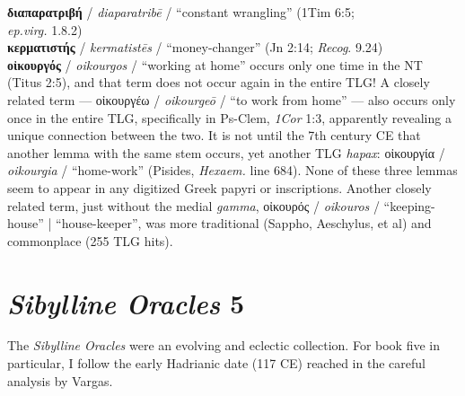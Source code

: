 \noindent{}\textbf{διαπαρατριβή} / \textit{diaparatribē} / “constant wrangling” %
(1Tim 6:5; \\\makebox[3em][l]{}\textit{ep.virg.} 1.8.2) \\[0.4mm] %
\noindent{}\textbf{κερματιστής} / \textit{kermatistēs} / “money-changer” %
(Jn 2:14; \textit{Recog}. 9.24) \\[1mm] %
\noindent{}\textbf{οἰκουργός} / \textit{oikourgos} / “working at home” occurs only one time in the NT (Titus 2:5), %
and that term does not occur again in the entire TLG! %
A closely related term --- οἰκουργέω / \textit{oikourgeō} / “to work from home” --- also occurs only once in the entire TLG, %
specifically in Ps-Clem, \textit{1Cor} 1:3, %
apparently revealing a unique connection between the two. %
It is not until the 7th century CE that another lemma with the same stem occurs, %
yet another TLG \textit{hapax}: οἰκουργία / \textit{oikourgia} / “home-work” (Pisides, \textit{Hexaem.} line 684). %
None of these three lemmas seem to appear in any digitized Greek papyri or inscriptions. %
Another closely related term, just without the medial \textit{gamma}, %
οἰκουρός / \textit{oikouros} / “keeping-house” | “house-keeper”, %
was more traditional (Sappho, Aeschylus, et al) and commonplace (255 TLG hits). \\[1mm] %

\section{\textit{Sibylline Oracles} 5}

\noindent{}The \textit{Sibylline Oracles} were an evolving and eclectic collection. %
For book five in particular, I follow the early Hadrianic date (117 CE) %
reached in the careful analysis by Vargas. \\[1mm] %

